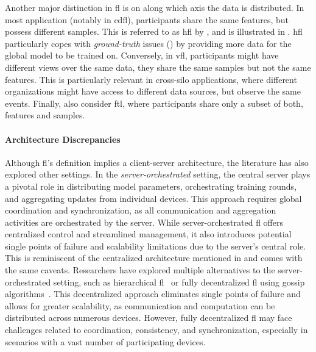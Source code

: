 Another major distinction in \gls{fl} is on along which axis the data is distributed.
In most application (notably in \gls{cdfl}), participants share the same features, but possess different samples.
This is referred to as \gls{hfl} by \textcite{yang_FederatedMachineLearning_2019}, and is illustrated in .
\Gls{hfl} particularly copes with \emph{ground-truth} issues () by providing more data for the global model to be trained on.
Conversely, in \gls{vfl}, participants might have different views over the same data, \ie they share the same samples but not the same features.
This is particularly relevant in cross-silo applications, where different organizations might have access to different data sources, but observe the same events.
Finally, \textcite{yang_FederatedMachineLearning_2019} also consider \gls{ftl}, where participants share only a subset of both, features and samples.


\paragraph{Architecture Discrepancies}

Although \gls{fl}'s definition implies a client-server architecture, the literature has also explored other settings.
In the \emph{server-orchestrated} setting, the central server plays a pivotal role in distributing model parameters, orchestrating training rounds, and aggregating updates from individual devices.
This approach requires global coordination and synchronization, as all communication and aggregation activities are orchestrated by the server.
While server-orchestrated \gls{fl} offers centralized control and streamlined management, it also introduces potential single points of failure and scalability limitations due to the server's central role.
This is reminiscent of the centralized architecture mentioned in  and comes with the same caveats.
Researchers have explored multiple alternatives to the server-orchestrated setting, such as hierarchical \gls{fl}~\cite{liu_ClientEdgeCloudHierarchicalFederated_2020} or fully decentralized \gls{fl} using gossip algorithms~\cite{tang_GossipFLDecentralizedFederated_2023}.
This decentralized approach eliminates single points of failure and allows for greater scalability, as communication and computation can be distributed across numerous devices.
However, fully decentralized \gls{fl} may face challenges related to coordination, consistency, and synchronization, especially in scenarios with a vast number of participating devices.


